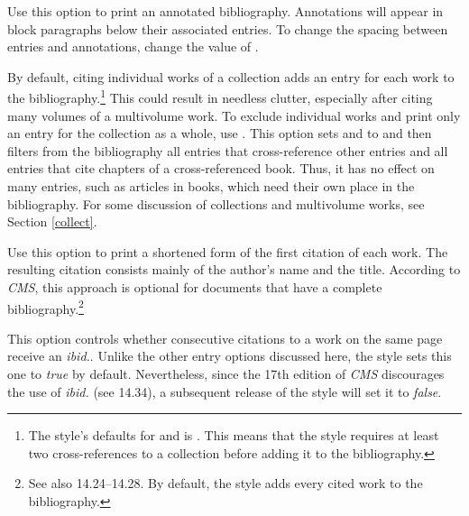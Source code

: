 \documentclass[11pt,letterpaper,oneside]{article}
\begin{document}
\begin{optionlist}


Use this option to print an annotated bibliography. Annotations will
appear in block paragraphs below their associated entries. To change
the spacing between entries and annotations, change the value of
.


By default, citing individual works of a collection adds an entry for
each work to the bibliography.\footnote{The style's defaults for
 and  is . This means
that the style requires at least two cross-references to a collection
before adding it to the bibliography.} This could result in needless
clutter, especially after citing many volumes of a multivolume work.
To exclude individual works and print only an entry for the collection
as a whole, use . This option sets 
and  to  and then filters from the
bibliography all  entries that cross-reference other
entries and all  entries that cite chapters of a
cross-referenced book. Thus, it has no effect on many
 entries, such as articles in books, which need
their own place in the bibliography. For some discussion of
collections and multivolume works, see Section \ref{collect}.


Use this option to print a shortened form of the first citation of
each work. The resulting citation consists mainly of the author's name
and the title. According to \textit{CMS}, this approach is optional
for documents that have a complete
bibliography.\footnote{\cite[14.14]{chicago2010} See also
14.24--14.28. By default, the style adds every cited work to the
bibliography.}


This option controls whether consecutive citations to a work on the
same page receive an \textit{ibid.}. Unlike the other entry options
discussed here, the style sets this one to \textit{true} by default.
Nevertheless, since the 17th edition of \textit{CMS} discourages the
use of \textit{ibid.} (see 14.34), a subsequent release of the style
will set it to \textit{false}.


\end{optionlist}
\end{document}
